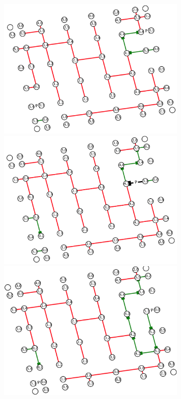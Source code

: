 \documentclass{article}
\begin{document}
\begin{figure}
\begin{subfigure}{.5\textwidth}
\end{subfigure}%
\begin{subfigure}{.5\textwidth}
  \vspace{-5.1\baselineskip}
  \includegraphics[width=1.1\linewidth,angle=-8]{figures/g2_dual_1.png}\\[0.5ex]
  \includegraphics[width=1.1\linewidth,angle=-8]{figures/g2_dual_2.png}
  \includegraphics[width=1.1\linewidth,angle=-8]{figures/g2_dual_3.png}

\end{subfigure}
\end{figure}
\end{document}
